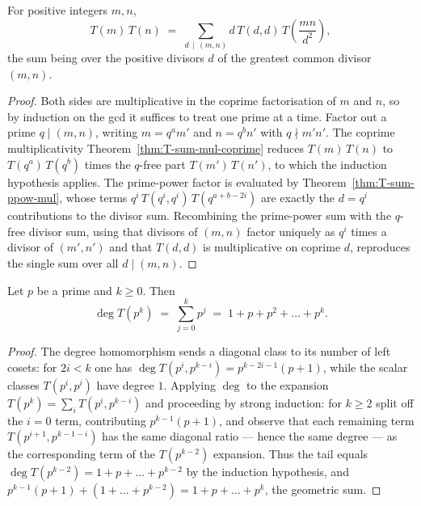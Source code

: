 \begin{theorem}\label{thm:T-sum-mul}
\leanok
For positive integers $m,n$,
\[
  T(m)\,T(n) \;=\; \sum_{d\,\mid\,(m,n)} d\,T(d,d)\,T\!\left(\frac{mn}{d^2}\right),
\]
the sum being over the positive divisors $d$ of the greatest common divisor $(m,n)$.
\end{theorem}

\begin{proof}
\leanok
Both sides are multiplicative in the coprime factorisation of $m$ and $n$, so by induction on the
gcd it suffices to treat one prime at a time. Factor out a prime $q\mid(m,n)$, writing
$m=q^a m'$ and $n=q^b n'$ with $q\nmid m'n'$. The coprime multiplicativity
Theorem~\ref{thm:T-sum-mul-coprime} reduces $T(m)\,T(n)$ to $T(q^a)\,T(q^b)$ times the
$q$-free part $T(m')\,T(n')$, to which the induction hypothesis applies. The prime-power factor is
evaluated by Theorem~\ref{thm:T-sum-ppow-mul}, whose terms $q^i\,T(q^i,q^i)\,T(q^{a+b-2i})$ are
exactly the $d=q^i$ contributions to the divisor sum. Recombining the prime-power sum with the
$q$-free divisor sum, using that divisors of $(m,n)$ factor uniquely as $q^i$ times a divisor of
$(m',n')$ and that $T(d,d)$ is multiplicative on coprime $d$, reproduces the single sum over all
$d\mid(m,n)$.
\end{proof}

\begin{theorem}\label{thm:deg-T-sum-prime-pow}
\leanok
Let $p$ be a prime and $k\ge 0$. Then
\[
  \deg T(p^k) \;=\; \sum_{j=0}^{k} p^{j} \;=\; 1+p+p^2+\dots+p^k.
\]
\end{theorem}

\begin{proof}
\leanok
The degree homomorphism sends a diagonal class to its number of left cosets: for $2i<k$ one has
$\deg T(p^i,p^{k-i})=p^{k-2i-1}(p+1)$, while the scalar classes $T(p^i,p^i)$ have degree $1$.
Applying $\deg$ to the expansion $T(p^k)=\sum_{i} T(p^i,p^{k-i})$ and proceeding by strong
induction: for $k\ge 2$ split off the $i=0$ term, contributing $p^{k-1}(p+1)$, and observe that
each remaining term $T(p^{i+1},p^{k-1-i})$ has the same diagonal ratio — hence the same degree —
as the corresponding term of the $T(p^{k-2})$ expansion. Thus the tail equals
$\deg T(p^{k-2})=1+p+\dots+p^{k-2}$ by the induction hypothesis, and
$p^{k-1}(p+1)+(1+\dots+p^{k-2})=1+p+\dots+p^k$, the geometric sum.
\end{proof}

